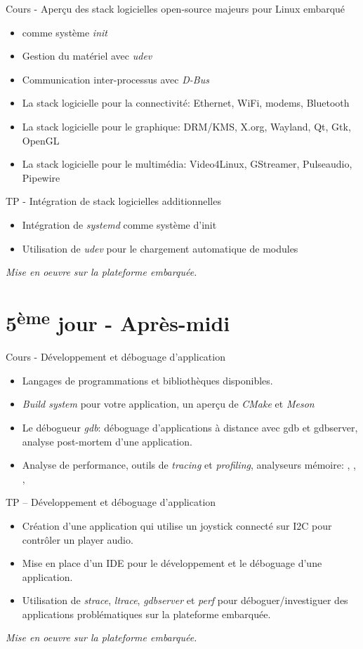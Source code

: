 \documentclass[a4paper,12pt,obeyspaces,spaces,hyphens]{article}
\begin{document}
\feagendatwocolumn
{Cours - Aperçu des stack logicielles open-source majeurs pour Linux embarqué}
{
  \begin{itemize}
  \item {} comme système {\em init}
  \item Gestion du matériel avec {\em udev}
  \item Communication inter-processus avec {\em D-Bus}
  \item La stack logicielle pour la connectivité: Ethernet, WiFi,
    modems, Bluetooth
  \item La stack logicielle pour le graphique: DRM/KMS, X.org,
    Wayland, Qt, Gtk, OpenGL
  \item La stack logicielle pour le multimédia: Video4Linux,
    GStreamer, Pulseaudio, Pipewire
  \end{itemize}
}
{TP - Intégration de stack logicielles additionnelles}
{
  \begin{itemize}
  \item Intégration de {\em systemd} comme système d'init
  \item Utilisation de {\em udev} pour le chargement automatique de
    modules
  \end{itemize}

  \vspace{0.5cm}
  {\em Mise en oeuvre sur la plateforme embarquée.}
}

\section{5\textsuperscript{ème} jour - Après-midi}

\feagendaonecolumn
{Cours - Développement et déboguage d'application}
{
  \begin{itemize}
  \item Langages de programmations et bibliothèques disponibles.
  \item {\em Build system} pour votre application, un aperçu de {\em
      CMake} et {\em Meson}
  \item Le débogueur {\em gdb}: déboguage d'applications à distance
    avec gdb et gdbserver, analyse post-mortem d'une application.
  \item Analyse de performance, outils de {\em tracing} et {\em
      profiling}, analyseurs mémoire: , ,
    , 
  \end{itemize}
}

\feagendaonecolumn
{TP – Développement et déboguage d'application}
{
  \begin{itemize}
  \item Création d'une application qui utilise un joystick connecté
    sur I2C pour contrôler un player audio.
  \item Mise en place d'un IDE pour le développement et le déboguage
    d'une application.
  \item Utilisation de {\em strace}, {\em ltrace}, {\em gdbserver} et
    {\em perf} pour déboguer/investiguer des applications
    problématiques sur la plateforme embarquée.
  \end{itemize}
  {\em Mise en oeuvre sur la plateforme embarquée.}
}
\end{document}
